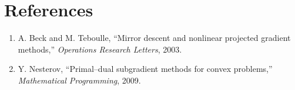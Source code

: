 \documentclass[11pt]{article}
\begin{document}
\section*{References}
\begin{enumerate}
\item A. Beck and M. Teboulle, “Mirror descent and nonlinear projected
gradient methods,” \emph{Operations Research Letters}, 2003.
\item Y. Nesterov, “Primal–dual subgradient methods for convex problems,”
\emph{Mathematical Programming}, 2009.
\end{enumerate}
\end{document}
